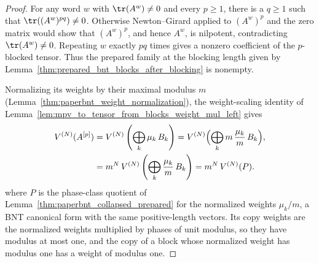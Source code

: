 \begin{proof}\leanok
    For any word $w$ with $\tr(A^w)\neq0$ and every $p\geq1$, there is a
    $q\geq1$ such that $\tr((A^w)^{pq})\neq0$. Otherwise Newton--Girard applied
    to $(A^w)^p$ and the zero matrix would show that $(A^w)^p$, and hence
    $A^w$, is nilpotent, contradicting $\tr(A^w)\neq0$. Repeating $w$ exactly
    $pq$ times gives a nonzero coefficient of the $p$-blocked tensor. Thus the
    prepared family at the blocking length given by
    Lemma~\ref{thm:prepared_bnt_blocks_after_blocking} is nonempty.

    Normalizing its weights by their maximal modulus $m$
    (Lemma~\ref{thm:paperbnt_weight_normalization}), the weight-scaling
    identity of
    Lemma~\ref{lem:mpv_to_tensor_from_blocks_weight_mul_left} gives
    \begin{align}
        V^{(N)}(A^{[p]})
         & =
        V^{(N)}\left(\bigoplus_k \mu_k\,B_k\right)
        =
        V^{(N)}\Bigl(\bigoplus_k
        m\,\frac{\mu_k}{m}\,B_k\Bigr),
        \notag \\
         & =
        m^{N}\,V^{(N)}\left(\bigoplus_k \frac{\mu_k}{m}\,B_k\right)
        =
        m^{N}\,V^{(N)}(P).
        \notag
    \end{align}
    where $P$ is the phase-class quotient of
    Lemma~\ref{thm:paperbnt_collapsed_prepared} for the normalized weights
    $\mu_k/m$, a BNT canonical form with the same positive-length vectors.
    Its copy weights are the normalized weights multiplied by phases of unit
    modulus, so they have modulus at most one, and the copy of a block whose
    normalized weight has modulus one has a weight of modulus one.
\end{proof}
